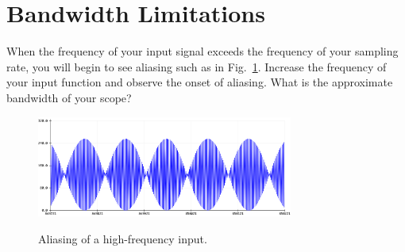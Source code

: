 \documentclass[12pt]{article}
\begin{document}
\section{Bandwidth Limitations}

When the frequency of your input signal exceeds the frequency of your sampling rate, you will begin to see aliasing such as in Fig.~\ref{fig:aliasing}.  Increase the frequency of your input function and observe the onset of aliasing.  What is the approximate bandwidth of your scope? 
\begin{figure}[htbp]
\begin{center}
{\includegraphics[width=0.75\textwidth]{figs/aliasing.png}}
\end{center}
\caption{\label{fig:aliasing} Aliasing of a high-frequency input.}
\end{figure}
\end{document}
